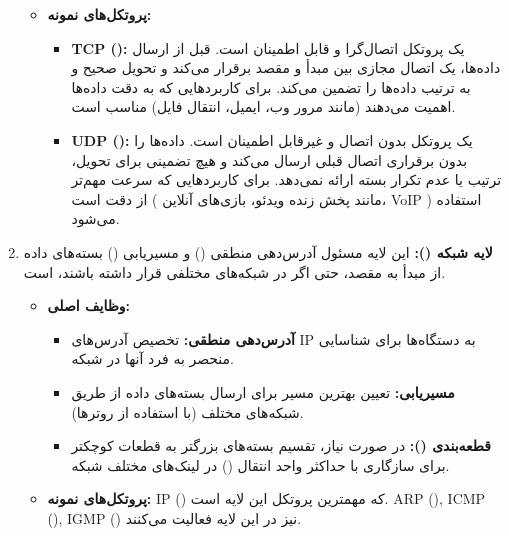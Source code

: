 \begin{enumerate}
\begin{itemize}
		\item \textbf{پروتکل‌های نمونه:}
		\begin{itemize}
			\item \textbf{TCP ():} یک پروتکل اتصال‌‌گرا‌ و قابل اطمینان است. قبل از ارسال داده‌ها، یک اتصال مجازی بین مبدأ و مقصد برقرار می‌کند و تحویل صحیح و به ترتیب داده‌ها را تضمین می‌کند. برای کاربردهایی که به دقت داده‌ها اهمیت می‌دهند (مانند مرور وب، ایمیل، انتقال فایل) مناسب است.
			
			\item \textbf{UDP ():} یک پروتکل بدون اتصال و غیرقابل اطمینان است. داده‌ها را بدون برقراری اتصال قبلی ارسال می‌کند و هیچ تضمینی برای تحویل، ترتیب یا عدم تکرار بسته ارائه نمی‌دهد. برای کاربردهایی که سرعت مهم‌تر از دقت است ( مانند پخش زنده ویدئو، بازی‌های آنلاین، VoIP ) استفاده می‌شود.
		\end{itemize}
	\end{itemize}
	
	\item \textbf{لایه شبکه ():}
	این لایه مسئول آدرس‌دهی منطقی () و مسیریابی () بسته‌های داده از مبدأ به مقصد، حتی اگر در شبکه‌های مختلفی قرار داشته باشند، است.
	\begin{itemize}
		\item \textbf{وظایف اصلی:}
		\begin{itemize}
			\item \textbf{آدرس‌دهی منطقی:} تخصیص آدرس‌های IP به دستگاه‌ها برای شناسایی منحصر به فرد آنها در شبکه.
			\item \textbf{مسیریابی:} تعیین بهترین مسیر برای ارسال بسته‌های داده از طریق شبکه‌های مختلف (با استفاده از روترها).
			\item \textbf{قطعه‌بندی ():} در صورت نیاز، تقسیم بسته‌های بزرگتر به قطعات کوچکتر برای سازگاری با حداکثر واحد انتقال () در لینک‌های مختلف شبکه.
		\end{itemize}
		\item \textbf{پروتکل‌های نمونه:} IP () که مهمترین پروتکل این لایه است. ARP (), ICMP (), IGMP () نیز در این لایه فعالیت می‌کنند.
	\end{itemize}
	

\end{enumerate}
